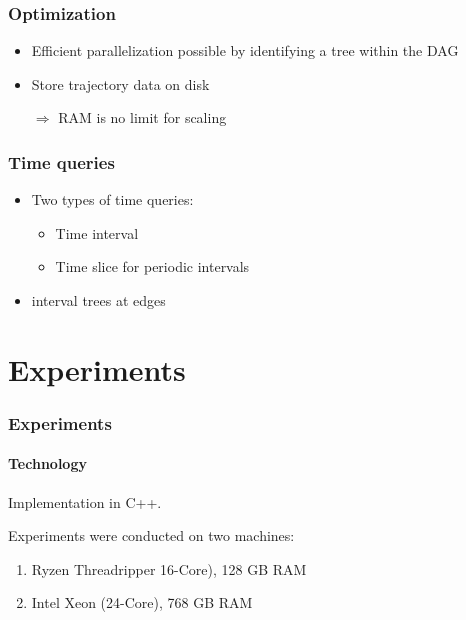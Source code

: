 \documentclass[10pt, t,
aspectratio=1610,%
usenames,
dvipsnames,
]{beamer}
\begin{document}
\begin{frame}
	\frametitle{Optimization}
	\begin{itemize}
		\item Efficient parallelization possible by identifying a tree within the DAG \pause
		\item Store trajectory data on disk \pause

		      $\Rightarrow$ RAM is no limit for scaling
	\end{itemize}
\end{frame}

\begin{frame}
	\frametitle{Time queries}
	\begin{itemize}

		\item	Two types of time queries: \pause
		      \begin{itemize}
			      \item Time interval \pause
			      \item Time slice for periodic intervals
		      \end{itemize}
		\item interval trees at edges
	\end{itemize}
\end{frame}

\section{Experiments}

\begin{frame}
	\frametitle{Experiments}
	\framesubtitle{Technology}
	Implementation in C++. \pause
	\medskip

	Experiments were conducted on two machines: \pause
	\begin{enumerate}
		\item Ryzen Threadripper 16-Core), 128 GB RAM
		\item Intel Xeon (24-Core), 768 GB RAM
	\end{enumerate}
\end{frame}
\end{document}
